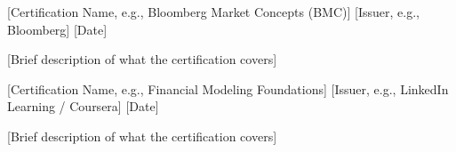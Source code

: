 

\begin{cventries}

  \cventry
    {[Certification Name, e.g., Bloomberg Market Concepts (BMC)]} %
    {[Issuer, e.g., Bloomberg]} %
    {} %
    {[Date]} %
    {
      \begin{cvitems}
        \item {[Brief description of what the certification covers]}
      \end{cvitems}
    }

  \cventry
    {[Certification Name, e.g., Financial Modeling Foundations]} %
    {[Issuer, e.g., LinkedIn Learning / Coursera]} %
    {} %
    {[Date]} %
    {
      \begin{cvitems}
        \item {[Brief description of what the certification covers]}
      \end{cvitems}
    }

\end{cventries}
